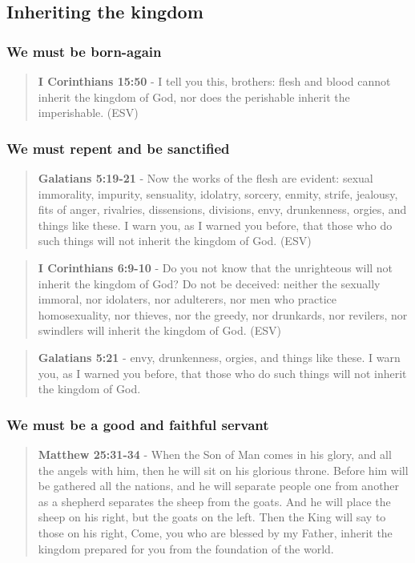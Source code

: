 \documentclass[11pt]{article}
\begin{document}
\subsection{Inheriting the kingdom}
\label{sec:org0361744}
\subsubsection{We must be born-again}
\label{sec:org359eee9}
\begin{quote}
\textbf{I Corinthians 15:50} - I tell you this, brothers: flesh and blood cannot inherit the kingdom of God, nor does the perishable inherit the imperishable. (ESV)
\end{quote}

\subsubsection{We must repent and be sanctified}
\label{sec:org1c1d0ea}
\begin{quote}
\textbf{Galatians 5:19-21} -  Now the works of the flesh are evident: sexual immorality, impurity, sensuality, idolatry, sorcery, enmity, strife, jealousy, fits of anger, rivalries, dissensions, divisions, envy, drunkenness, orgies, and things like these.  I warn you, as I warned you before, that those who do such things will not inherit the kingdom of God. (ESV)
\end{quote}

\begin{quote}
\textbf{I Corinthians 6:9-10} - Do you not know that the unrighteous will not inherit the kingdom of God? Do not be deceived: neither the sexually immoral, nor idolaters, nor adulterers, nor men who practice homosexuality, nor thieves, nor the greedy, nor drunkards, nor revilers, nor swindlers will inherit the kingdom of God. (ESV)
\end{quote}

\begin{quote}
\textbf{Galatians 5:21} - envy, drunkenness, orgies, and things like these. I warn you, as I warned you before, that those who do such things will not inherit the kingdom of God.
\end{quote}

\subsubsection{We must be a good and faithful servant}
\label{sec:orgb1c3ee9}
\begin{quote}
\textbf{Matthew 25:31-34} - When the Son of Man comes in his glory, and all the angels with him, then he will sit on his glorious throne. Before him will be gathered all the nations, and he will separate people one from another as a shepherd separates the sheep from the goats. And he will place the sheep on his right, but the goats on the left. Then the King will say to those on his right, Come, you who are blessed by my Father, inherit the kingdom prepared for you from the foundation of the world.
\end{quote}
\end{document}
